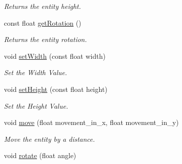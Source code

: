 \begin{DoxyCompactItemize}
\begin{DoxyCompactList}\small\item\em Returns the entity height. \end{DoxyCompactList}\item 
\hypertarget{class_orientation_ab3568e037a7dc7799d557f2bc6a3cf7d}{const float \hyperlink{class_orientation_ab3568e037a7dc7799d557f2bc6a3cf7d}{get\+Rotation} ()}\label{class_orientation_ab3568e037a7dc7799d557f2bc6a3cf7d}

\begin{DoxyCompactList}\small\item\em Returns the entity rotation. \end{DoxyCompactList}\item 
\hypertarget{class_orientation_a1b5cd490e5bbbe2b8d683be389dbcbbe}{void \hyperlink{class_orientation_a1b5cd490e5bbbe2b8d683be389dbcbbe}{set\+Width} (const float width)}\label{class_orientation_a1b5cd490e5bbbe2b8d683be389dbcbbe}

\begin{DoxyCompactList}\small\item\em Set the Width Value. \end{DoxyCompactList}\item 
\hypertarget{class_orientation_a1adca89bc32128e2ca1cb937357f5006}{void \hyperlink{class_orientation_a1adca89bc32128e2ca1cb937357f5006}{set\+Height} (const float height)}\label{class_orientation_a1adca89bc32128e2ca1cb937357f5006}

\begin{DoxyCompactList}\small\item\em Set the Height Value. \end{DoxyCompactList}\item 
\hypertarget{class_orientation_ae1c8122591724b1b3bfcb0026b76e809}{void \hyperlink{class_orientation_ae1c8122591724b1b3bfcb0026b76e809}{move} (float movement\+\_\+in\+\_\+x, float movement\+\_\+in\+\_\+y)}\label{class_orientation_ae1c8122591724b1b3bfcb0026b76e809}

\begin{DoxyCompactList}\small\item\em Move the entity by a distance. \end{DoxyCompactList}\item 
\hypertarget{class_orientation_aa9e115b7f4ab487e3af532592416b247}{void \hyperlink{class_orientation_aa9e115b7f4ab487e3af532592416b247}{rotate} (float angle)}\label{class_orientation_aa9e115b7f4ab487e3af532592416b247}


\end{DoxyCompactItemize}
